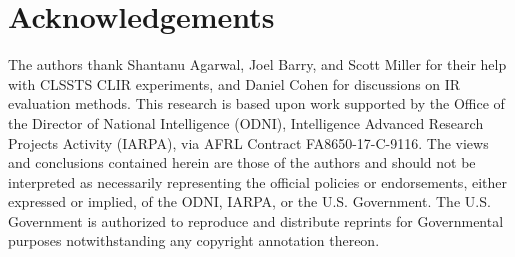 \section*{Acknowledgements}

The authors thank Shantanu Agarwal, Joel Barry, and Scott Miller for their help with CLSSTS CLIR experiments, and Daniel Cohen for discussions on IR evaluation methods. This research is based upon work supported by the Office of the Director of National Intelligence (ODNI), Intelligence Advanced Research Projects Activity (IARPA), via AFRL Contract FA8650-17-C-9116.  The views and conclusions contained herein are those of the authors and should not be interpreted as necessarily representing the official policies or endorsements, either expressed or implied, of the ODNI, IARPA, or the U.S. Government. The U.S. Government is authorized to reproduce and distribute reprints for Governmental purposes notwithstanding any copyright annotation thereon.
